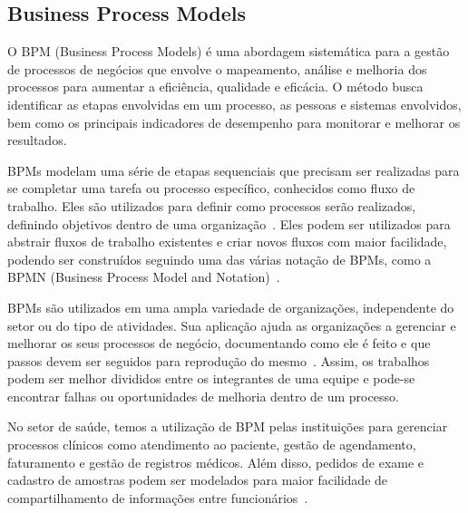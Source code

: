 \subsection{Business Process Models}


O BPM (Business Process Models) é uma abordagem sistemática para a gestão de processos de negócios que envolve o mapeamento, análise e melhoria dos processos para aumentar a eficiência, qualidade e eficácia. O método busca identificar as etapas envolvidas em um processo, as pessoas e sistemas envolvidos, bem como os principais indicadores de desempenho para monitorar e melhorar os resultados.


BPMs modelam uma série de etapas sequenciais que precisam ser realizadas para se completar uma tarefa ou processo específico, conhecidos como fluxo de trabalho. Eles são utilizados para definir como processos serão realizados, definindo objetivos dentro de uma organização~\cite{Alves2014UnderstandingOrganizations}. Eles podem ser utilizados para abstrair fluxos de trabalho existentes e criar novos fluxos com maior facilidade, podendo ser construídos seguindo uma das várias notação de BPMs, como a BPMN (Business Process Model and Notation)~\cite{Dijkman2008SemanticsBPMN}.



BPMs são utilizados em uma ampla variedade de organizações, independente do setor ou do tipo de atividades. Sua aplicação ajuda as organizações a gerenciar e melhorar os seus processos de negócio, documentando como ele é feito e que passos devem ser seguidos para reprodução do mesmo~\cite{DaSilva2014BusinessNot}. Assim, os trabalhos podem ser melhor divididos entre os integrantes de uma equipe e pode-se encontrar falhas ou oportunidades de melhoria dentro de um processo.



No setor de saúde, temos a utilização de BPM pelas instituições para gerenciar processos clínicos como atendimento ao paciente, gestão de agendamento, faturamento e gestão de registros médicos. Além disso, pedidos de exame e cadastro de amostras podem ser modelados para maior facilidade de compartilhamento de informações entre funcionários~\cite{Ruiz2012BusinessHealthcare.}.

